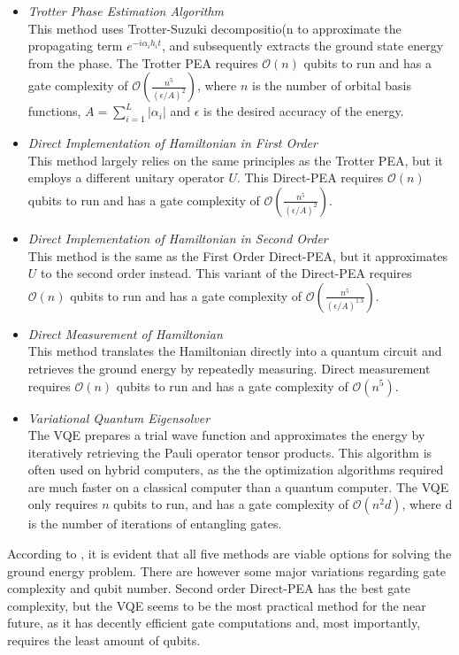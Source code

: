 \begin{itemize}
  \item \emph{Trotter Phase Estimation Algorithm}
  \\ This method uses Trotter-Suzuki decompositio(n to approximate  the propagating term $ e^{-i \alpha_{i} h_{i} t}$, and subsequently extracts the ground state energy from the phase. The Trotter PEA requires $\mathcal{O}(n)$ qubits to run and has a gate complexity of $\mathcal{O}(\frac{n^{5}}{(\epsilon / A)^{2}})$, where $n$ is the number of orbital basis functions, $A=\sum_{i=1}^{L}\left|\alpha_{i}\right|$ and $\epsilon$ is the desired accuracy of the energy.
  \item \emph{Direct Implementation of Hamiltonian in First Order}
  \\This method largely relies on the same principles as the Trotter PEA, but it employs a different unitary operator $U$. This Direct-PEA requires $\mathcal{O}(n)$ qubits to run and has a gate complexity of $\mathcal{O}(\frac{n^{5}}{(\epsilon / A)^{2}}).$
  \item \emph{Direct Implementation of Hamiltonian in Second Order}
  \\This method is the same as the First Order Direct-PEA, but it approximates $U$ to the second order instead. This variant of the Direct-PEA requires $\mathcal{O}(n)$ qubits to run and has a gate complexity of $\mathcal{O}(\frac{n^{5}}{(\epsilon / A)^{1.3}}).$
  \item \emph{Direct Measurement of Hamiltonian}
  \\This method translates the Hamiltonian directly into a quantum circuit and retrieves the ground energy by repeatedly measuring. Direct measurement requires $\mathcal{O}(n)$ qubits to run and has a gate complexity of $\mathcal{O}(n^{5}).$
  \item \emph{Variational Quantum Eigensolver}
  \\The VQE prepares a trial wave function and approximates the energy by iteratively retrieving the Pauli operator tensor products. This algorithm is often used on hybrid computers, as the the optimization algorithms required are much faster on a classical computer than a quantum computer. The VQE only requires $n$ qubits to run, and has a gate complexity of $\mathcal{O}(n^{2} d)$, where d is the number of iterations of entangling gates.

\end{itemize}

According to \textcite{bian}, it is evident that all five methods are viable options for solving the ground energy problem. There are however some major variations regarding gate complexity and qubit number. Second order Direct-PEA has the best gate complexity, but the VQE seems to be the most practical method for the near future, as it has decently efficient gate computations and, most importantly, requires the least amount of qubits.

